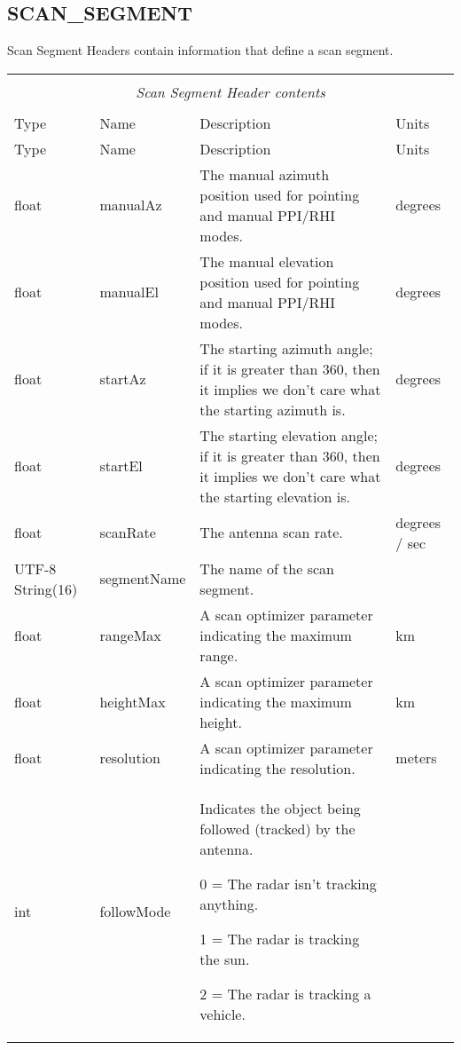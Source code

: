\documentclass[10pt]{article}
\newcommand{\tblspc}{\rule{0pt}{3ex}}
\begin{document}
\subsection{SCAN\_SEGMENT}
\label{sec:scan_segment}
Scan Segment Headers contain information that define a scan segment.
\begin{longtable}{|p{}|l|p{}|p{}|}
\hline
\multicolumn{4}{|c|}{} \\
\multicolumn{4}{|c|}{\emph{Scan Segment Header contents}} \\
\multicolumn{4}{|c|}{} \\
\hline Type & Name & Description & Units \\ \hline \endfirsthead
\hline Type & Name & Description & Units \\ \hline \endhead
\hline \endfoot
\tblspc float & manualAz & The manual azimuth position used for pointing and manual PPI/RHI modes. & degrees \\
\hline
\tblspc float & manualEl & The manual elevation position used for pointing and manual PPI/RHI modes. & degrees \\
\hline
\tblspc float & startAz & The starting azimuth angle; if it is greater than 360, then it implies we don't care what the starting azimuth is. & degrees \\
\hline
\tblspc float & startEl & The starting elevation angle; if it is greater than 360, then it implies we don't care what the starting elevation is. & degrees \\
\hline
\tblspc float & scanRate & The antenna scan rate. & degrees / sec \\
\hline
\tblspc UTF-8 String(16) & segmentName & The name of the scan segment. & \\
\hline
\tblspc float & rangeMax & A scan optimizer parameter indicating the maximum range. & km \\
\hline
\tblspc float & heightMax & A scan optimizer parameter indicating the maximum height. & km \\
\hline
\tblspc float & resolution & A scan optimizer parameter indicating the resolution. & meters \\
\hline
\tblspc int & followMode & Indicates the object being followed (tracked) by the antenna.
	\par 0 = The radar isn't tracking anything.
	\par 1 = The radar is tracking the sun.
	\par 2 = The radar is tracking a vehicle. & \\

\end{longtable}
\end{document}
